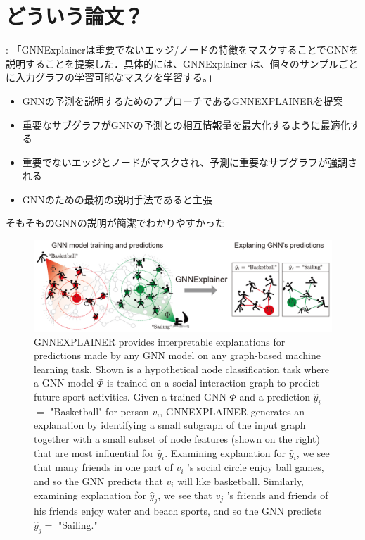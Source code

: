 \documentclass[a4paper,10pt]{ltjsarticle}
\newcommand{\1}{\mbox{1}\hspace{-0.25em}\mbox{l}}
\theoremstyle{definition}
\begin{document}
    \section{どういう論文？}
    \cite{li2022explainability}: 「GNNExplainerは重要でないエッジ/ノードの特徴をマスクすることでGNNを説明することを提案した．具体的には、GNNExplainer は、個々のサンプルごとに入力グラフの学習可能なマスクを学習する。」
    \begin{itemize}
        \item GNNの予測を説明するためのアプローチであるGNNEXPLAINERを提案
        \item 重要なサブグラフがGNNの予測との相互情報量を最大化するように最適化する
        \item 重要でないエッジとノードがマスクされ、予測に重要なサブグラフが強調される
        \item GNNのための最初の説明手法であると主張
    \end{itemize}
    そもそものGNNの説明が簡潔でわかりやすかった
    \begin{figure}[H]
        \centering
        \includegraphics[width=120mm]{fig/gnnexplainer_fig1}
        \caption{
            GNNEXPLAINER provides interpretable explanations for predictions made by any GNN model on
            any graph-based machine learning task. Shown is a hypothetical node classification task where
            a GNN model $\Phi$ is trained on a social interaction graph to predict future sport activities.
            Given a trained GNN $\Phi$ and a prediction $\hat{y}_{i}$ $=$ "Basketball" for person $v_{i}$,
            GNNEXPLAINER generates an explanation by identifying a small subgraph of the input graph together
            with a small subset of node features (shown on the right) that are most influential for $\hat{y}_{i}$.
            Examining explanation for $\hat{y}_{i}$, we see that many friends in one part of $v_{i}$ 's social circle
            enjoy ball games, and so the GNN predicts that $v_{i}$ will like basketball. Similarly, examining
            explanation for $\hat{y}_{j}$, we see that $v_{j}$ 's friends and friends of his friends enjoy water and
            beach sports, and so the GNN predicts $\hat{y}_{j}=$ "Sailing."}
    \end{figure}
\end{document}
